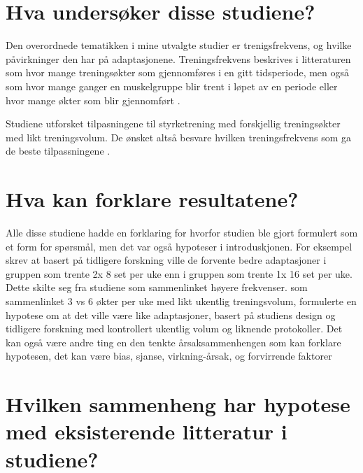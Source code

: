 \documentclass[
]{book}
\begin{document}
\hypertarget{hva-undersuxf8ker-disse-studiene}{%
\section{Hva undersøker disse studiene?}\label{hva-undersuxf8ker-disse-studiene}}

Den overordnede tematikken i mine utvalgte studier er trenigsfrekvens, og hvilke påvirkninger den har på adaptasjonene. Treningsfrekvens beskrives i litteraturen som hvor mange treningsøkter som gjennomføres i en gitt tidsperiode, men også som hvor mange ganger en muskelgruppe blir trent i løpet av en periode eller hvor mange økter som blir gjennomført \citep{kraemer2004, schoenfeld2016}.

Studiene utforsket tilpasningene til styrketrening med forskjellig treningsøkter med likt treningsvolum. De ønsket altså besvare hvilken treningsfrekvens som ga de beste tilpassningene \citep{johnsen2021, brigatto2019, gentil2018, saric2019, lasevicius2019}.

\hypertarget{hva-kan-forklare-resultatene}{%
\section{Hva kan forklare resultatene?}\label{hva-kan-forklare-resultatene}}

Alle disse studiene hadde en forklaring for hvorfor studien ble gjort formulert som et form for spørsmål, men det var også hypoteser i introduskjonen. For eksempel skrev \citep{brigatto2019} at basert på tidligere forskning ville de forvente bedre adaptasjoner i gruppen som trente 2x 8 set per uke enn i gruppen som trente 1x 16 set per uke. Dette skilte seg fra studiene som sammenlinket høyere frekvenser. \citep{saric2019} som sammenlinket 3 vs 6 økter per uke med likt ukentlig treningsvolum, formulerte en hypotese om at det ville være like adaptasjoner, basert på studiens design og tidligere forskning med kontrollert ukentlig volum og liknende protokoller. Det kan også være andre ting en den tenkte årsaksammenhengen som kan forklare hypotesen, det kan være bias, sjanse, virkning-årsak, og forvirrende faktorer \citep{hulley_2013}

\hypertarget{hvilken-sammenheng-har-hypotese-med-eksisterende-litteratur-i-studiene}{%
\section{Hvilken sammenheng har hypotese med eksisterende litteratur i studiene?}\label{hvilken-sammenheng-har-hypotese-med-eksisterende-litteratur-i-studiene}}
\end{document}
